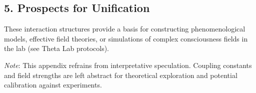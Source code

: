 \subsection*{5. Prospects for Unification}

These interaction structures provide a basis for constructing phenomenological models, effective field theories, or simulations of complex consciousness fields in the lab (see Theta Lab protocols).

\bigskip
\textit{Note}: This appendix refrains from interpretative speculation. Coupling constants and field strengths are left abstract for theoretical exploration and potential calibration against experiments.
